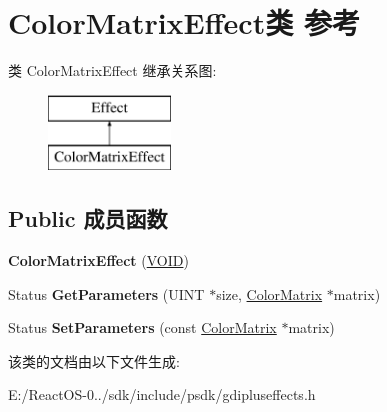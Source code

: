 \hypertarget{class_color_matrix_effect}{}\section{Color\+Matrix\+Effect类 参考}
\label{class_color_matrix_effect}
类 Color\+Matrix\+Effect 继承关系图\+:\begin{figure}[H]
\begin{center}
\leavevmode
\includegraphics[height=2.000000cm]{class_color_matrix_effect}
\end{center}
\end{figure}
\subsection*{Public 成员函数}
\begin{DoxyCompactItemize}
\item 
\mbox{\label{class_color_matrix_effect_ac59b5a7bf00187be3cc6eed65ecb9175}} 
{\bfseries Color\+Matrix\+Effect} (\hyperlink{interfacevoid}{V\+O\+ID})
\item 
\mbox{\label{class_color_matrix_effect_a24d1dd22c63d7f0fcfa229d66194a76c}} 
Status {\bfseries Get\+Parameters} (U\+I\+NT $\ast$size, \hyperlink{struct_color_matrix}{Color\+Matrix} $\ast$matrix)
\item 
\mbox{\label{class_color_matrix_effect_a41baddb6577af3fe7722a0254ac17299}} 
Status {\bfseries Set\+Parameters} (const \hyperlink{struct_color_matrix}{Color\+Matrix} $\ast$matrix)
\end{DoxyCompactItemize}


该类的文档由以下文件生成\+:\begin{DoxyCompactItemize}
\item 
E\+:/\+React\+O\+S-\/0../sdk/include/psdk/gdipluseffects.\+h\end{DoxyCompactItemize}

